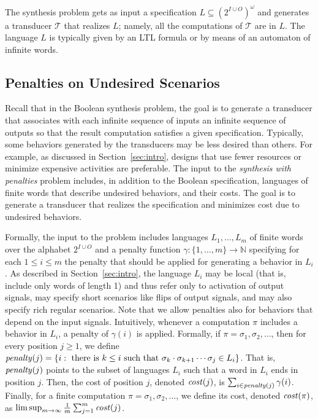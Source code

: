 \documentclass[runningheads,a4paper]{llncs}
\newcommand{\Nat}{\mathbb{N}}
\newcommand{\T}{{\mathcal T}}
\newcommand{\cost}{{\it cost}}
\begin{document}
The synthesis problem gets as input a specification $L \subseteq (2^{I \cup O})^\omega$ and generates a transducer $\T$ that realizes $L$; namely, all the computations of $\T$ are in $L$. The language $L$ is typically given by an LTL formula \cite{Pnu81} or by means of an automaton of infinite words. 


\vspace*{-8pt}
\subsection{Penalties on Undesired Scenarios}
Recall that in the Boolean synthesis problem, the goal is to generate a transducer that associates with each infinite sequence of inputs an infinite sequence of outputs so that the result computation satisfies a given specification. Typically, some behaviors generated by the transducers may be less desired than others. For example, as discussed in Section~\ref{sec:intro}, designs that use fewer resources or minimize expensive activities are preferable. The input to the {\em synthesis with penalties\/} problem includes, in addition to the Boolean specification, languages of finite words that describe undesired behaviors, and their costs. 
The goal is to generate a transducer that realizes the specification and minimizes cost due to undesired behaviors. 

Formally, the input to the problem includes languages $L_1,\ldots,L_m$ of finite words over the alphabet $2^{I \cup O}$ and a penalty function $\gamma:\{1,\ldots,m\}\to \Nat$ specifying for each $1 \leq i \leq m$ the penalty that should be applied for generating a behavior in $L_i$. As described in Section~\ref{sec:intro}, the language $L_i$ may be local (that is, include only words of length 1) and thus refer only to activation of output signals, may specify short scenarios like flips of output signals, and may also specify rich regular scenarios. Note that we allow penalties also for behaviors that depend on the input signals. Intuitively, whenever a computation $\pi$ includes a behavior in $L_i$, a penalty of $\gamma(i)$ is applied. Formally, if $\pi=\sigma_1,\sigma_2,\ldots$, then for every position $j \geq 1$, we define ${\it penalty}(j) = \{i : \mbox{ there is } k \leq i \mbox{ such that } \sigma_k \cdot \sigma_{k+1} \cdots \sigma_j \in L_i\}$. That is, ${\it penalty}(j)$ points to the subset of languages $L_i$ such that a word in $L_i$ ends in position $j$. Then, the cost of position $j$, denoted $\cost(j)$, is $\sum_{i \in {\it penalty}(j)} \gamma(i)$. 
Finally, for a finite computation $\pi=\sigma_1,\sigma_2,\ldots$, we define its cost, denoted $\cost(\pi)$, as $\limsup_{m \rightarrow \infty}\frac{1}{m}\sum_{j=1}^{m}{\cost(j)}$.
\end{document}

